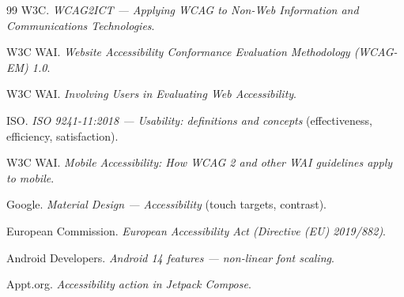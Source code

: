 \begin{thebibliography}{99}
 W3C.
\emph{WCAG2ICT --- Applying WCAG to Non-Web Information and Communications Technologies}.

 W3C WAI.
\emph{Website Accessibility Conformance Evaluation Methodology (WCAG-EM) 1.0}.

 W3C WAI.
\emph{Involving Users in Evaluating Web Accessibility}.

 ISO.
\emph{ISO 9241-11:2018 --- Usability: definitions and concepts} (effectiveness, efficiency,
satisfaction).

 W3C WAI.
\emph{Mobile Accessibility: How WCAG 2 and other WAI guidelines apply to mobile}.

 Google.
\emph{Material Design --- Accessibility} (touch targets, contrast).

 European Commission.
\emph{European Accessibility Act (Directive (EU) 2019/882)}.

 Android Developers.
\emph{Android 14 features --- non-linear font scaling}.

 Appt.org.
\emph{Accessibility action in Jetpack Compose}.

\end{thebibliography}
